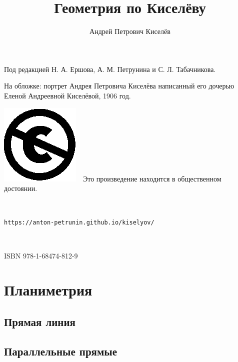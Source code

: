 \documentclass[twoside]{book}
\begin{document}


\cleardoublepage
\frontmatter
\title{Геометрия по Киселёву}
\author{Андрей Петрович Киселёв}
\date{}
\maketitle

\thispagestyle{empty}

Под редакцией Н. А. Ершова, А. М. Петрунина и С. Л. Табачникова.

На обложке: портрет  Андрея Петровича Киселёва написанный его дочерью Еленой Андреевной Киселёвой, 1906 год.

\vfill

\noindent
\includegraphics[scale=.25]{eps/Cc-public_domain_mark_white}\ \ 
Это произведение находится в общественном достоянии.

\ 

\noindent\texttt{https://anton-petrunin.github.io/kiselyov/} 

\ 

\noindent ISBN 978-1-68474-812-9

\mainmatter




\cleardoublepage
\part{Планиметрия}

\chapter{Прямая линия}





\chapter{Параллельные прямые}









\end{document}
